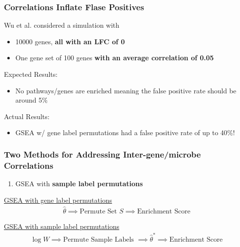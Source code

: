 \documentclass[11pt]{beamer}
\begin{document}
\begin{frame}
  \frametitle{Correlations Inflate Flase Positives}
  Wu et al. considered a simulation with
  \begin{itemize}
    \item 10000 genes, \textbf{all with an LFC of 0}
    \item One gene set of 100 genes \textbf{with an average correlation of 0.05}
  \end{itemize}

  \pause

  Expected Results:
  \begin{itemize}
    \item No pathways/genes are enriched meaning the false positive rate should be around 5\%
  \end{itemize}

  \pause
    
  Actual Results:
  \begin{itemize}
    \item GSEA w/ gene label permutations had a false positive rate of up to 40\%!
  \end{itemize}
\end{frame}

\begin{frame}
  \frametitle{Two Methods for Addressing Inter-gene/microbe Correlations}

  \pause
  
  \begin{enumerate}
    \item GSEA with \textbf{sample label permutations}
\end{enumerate}
      \vspace{15px}
      \underline{GSEA with gene label permutations}
      \begin{align*}
        \hat{\theta} \implies \text{Permute Set } S \implies \text{Enrichment Score}
      \end{align*}

      \vspace{5px}
      \underline{GSEA with sample label permutations}
      \begin{align*}
        \log \hat{W} \implies \text{Permute Sample Labels } \implies \hat{\theta}^* \implies \text{Enrichment Score}
      \end{align*}

  
  
\end{frame}
\end{document}
